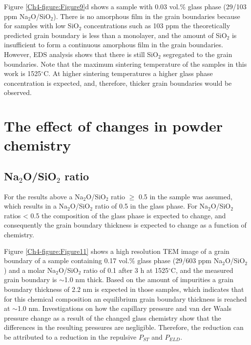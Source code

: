 Figure \ref{Ch4-figure:Figure9}d shows a sample with 0.03 vol.\% glass phase (29/103 ppm Na$_{2}$O/SiO$_{2}$). There is no amorphous film in the grain boundaries because for samples with low SiO$_{2}$ concentrations such as 103 ppm the theoretically predicted grain boundary is less than a monolayer, and the amount of SiO$_{2}$ is insufficient to form a continuous amorphous film in the grain boundaries. However, EDS analysis shows that there is still SiO$_{2}$ segregated to the grain boundaries. Note that the maximum sintering temperature of the samples in this work is 1525$^{\circ}$C. At higher sintering temperatures a higher glass phase concentration is expected, and, therefore, thicker grain boundaries would be observed.

\section{The effect of changes in powder chemistry}
\subsection{Na$_{2}$O/SiO$_{2}$ ratio}
For the results above a Na$_{2}$O/SiO$_{2}$ ratio $\geq$ 0.5 in the sample was assumed, which results in a Na$_{2}$O/SiO$_{2}$ ratio of 0.5 in the glass phase. For Na$_{2}$O/SiO$_{2}$ ratios < 0.5 the composition of the glass phase is expected to change, and consequently the grain boundary thickness is expected to change as a function of chemistry. 

Figure \ref{Ch4-figure:Figure11} shows a high resolution TEM image of a grain boundary of a sample containing 0.17 vol.\% glass phase (29/603 ppm Na$_{2}$O/SiO$_{2}$) and a molar Na$_{2}$O/SiO$_{2}$ ratio of 0.1 after 3 h at 1525$^{\circ}$C, and the measured grain boundary is $\sim$1.0 nm thick. Based on the amount of impurities a grain boundary thickness of 2.2 nm is expected in those samples, which indicates that for this chemical composition an equilibrium grain boundary thickness \cite{Subramaniam2006} is reached at $\sim$1.0 nm. Investigations on how the capillary pressure and van der Waals pressure change as a result of the changed glass chemistry show that the differences in the resulting pressures are negligible. Therefore, the reduction can be attributed to a reduction in the repulsive $P_{ST}$ and $P_{ELD}$. 


